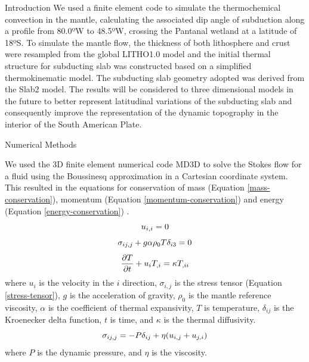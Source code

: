 \documentclass[final]{beamer}
\newlength{\colwidth}
\begin{document}
\begin{frame}[t]
\begin{columns}[t]
\begin{column}{\colwidth}
\begin{block}{Introduction}
    We used a finite element code to simulate the thermochemical convection in the mantle, calculating the associated dip angle of subduction along a profile from 80.0ºW to 48.5ºW, crossing the Pantanal wetland at a latitude of 18ºS. To simulate the mantle flow, the thickness of both lithosphere and crust were resampled from the global LITHO1.0 model and the initial thermal structure for subducting slab was constructed based on a simplified thermokinematic model. The subducting slab geometry adopted was derived from the Slab2 model. The results will be considered to three dimensional models in the future to better represent latitudinal variations of the subducting slab and consequently improve the representation of the dynamic topography in the interior of the South American Plate. 
    
  \end{block}

  \begin{block}{Numerical Methods}

    We used the 3D finite element numerical code MD3D \cite{sacek2017post} to solve the Stokes flow for a fluid using the Boussinesq approximation in a Cartesian coordinate system. This resulted in the equations for conservation of mass (Equation \ref{mass-conservation}), momentum (Equation \ref{momentum-conservation}) and energy (Equation \ref{energy-conservation}) \cite{treatise7.05}.
    \begin{equation}{\label{mass-conservation}}
        u_{i,i}=0
    \end{equation}
    \begin{equation}{\label{momentum-conservation}}
        \sigma_{ij,j}+g\alpha \rho_0 T \delta_{i3} = 0
    \end{equation}
    \begin{equation}{\label{energy-conservation}}
       \frac{\partial T}{\partial t}+u_{i}T_{,i}=\kappa T_{,ii}
    \end{equation}
    where $u_i$ is the velocity in the $i$ direction, $\sigma_{i,j}$ is the stress tensor (Equation \autoref{stress-tensor}), $g$ is the acceleration of gravity, $\rho_{0}$ is the mantle reference viscosity, $\alpha$ is the coefficient of thermal expansivity, $T$ is temperature, $\delta_{ij}$ is the Kroenecker delta function, $t$ is time, and $\kappa$ is the thermal diffusivity. %
    \begin{equation}{\label{stress-tensor}}
        \sigma_{ij,j}=-P\delta_{ij}+\eta(u_{i,j}+u_{j,i})
    \end{equation}
    where $P$ is the dynamic pressure, and $\eta$ is the viscosity.
    

\end{block}
\end{column}
\end{columns}
\end{frame}
\end{document}
